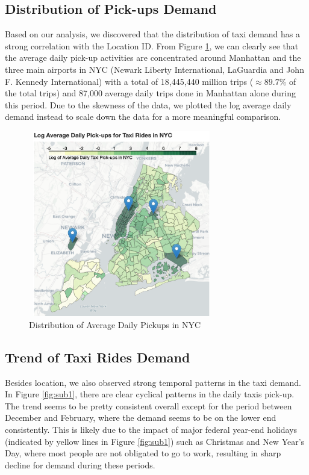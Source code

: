 \documentclass[11pt]{article}
\begin{document}
\subsection{Distribution of Pick-ups Demand}
Based on our analysis, we discovered that the distribution of taxi demand has a strong correlation with the Location ID. From Figure \ref{fig:label}, we can clearly see that the average daily pick-up activities are concentrated around Manhattan and the three main airports in NYC (Newark Liberty International, LaGuardia and John F. Kennedy International) with a total of 18,445,440 million trips ($\approx89.7\%$ of the total trips) and 87,000 average daily trips done in Manhattan alone during this period. Due to the skewness of the data, we plotted the log average daily demand instead to scale down the data for a more meaningful comparison.
\begin{figure}[h]
    \centering
    \includegraphics[width=3.2in, height=3.2in]{plots/location_pickup.png}

    \caption{Distribution of Average Daily Pickups in NYC}
    \label{fig:label}
    
\end{figure}
\subsection{Trend of Taxi Rides Demand}
Besides location, we also observed strong temporal patterns in the taxi demand. In Figure \ref{fig:sub1}, there are clear cyclical patterns in the daily taxis pick-up. The trend seems to be pretty consistent overall except for the period between December and February, where the demand seems to be on the lower end consistently. This is likely due to the impact of major federal year-end holidays (indicated by yellow lines in Figure \ref{fig:sub1}) such as Christmas and New Year's Day, where most people are not obligated to go to work, resulting in sharp decline for demand during these periods.
\end{document}

